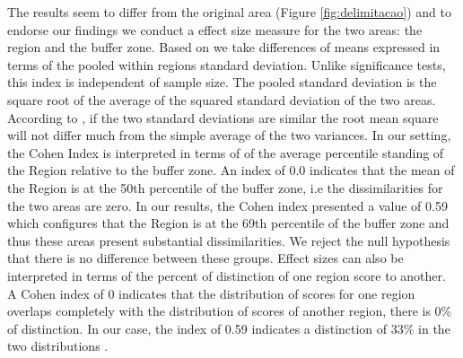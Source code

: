 The results seem to differ from the original area (Figure \ref{fig:delimitacao}) and to endorse our findings we conduct a effect size measure for the two areas: the region and the buffer zone. Based on \citet{COHEN1977} we take differences of means expressed in terms of the pooled within regions standard deviation. Unlike significance tests, this index is independent of sample size. The pooled standard deviation is the square root of the average of the squared standard deviation of the two areas. According to \citet{COHEN1977}, if the two standard deviations are similar the root mean square will not differ much from the simple average of the two variances. In our setting, the Cohen Index is interpreted in terms of of the average percentile standing of the Region relative to the buffer zone. An index of 0.0 indicates that the mean of the Region is at the 50th percentile of the buffer zone, i.e the dissimilarities for the two areas are zero. In our results, the Cohen index presented a value of 0.59 which configures that the Region is at the 69th percentile of the buffer zone and thus these areas present substantial dissimilarities. We reject the null hypothesis that there is no difference between these groups. Effect sizes can also be interpreted in terms of the percent of distinction of one region score to another. A Cohen index of 0 indicates that the distribution of scores for one region overlaps completely with the distribution of scores of another region, there is 0\% of distinction. In our case, the index of 0.59 indicates a distinction of 33\% in the two distributions \citep{COHEN1977}.

